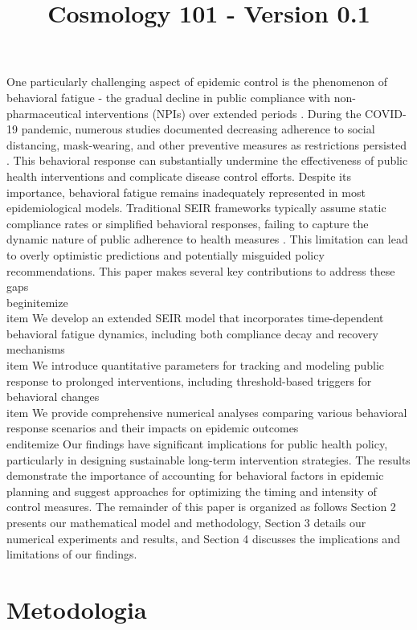 \documentclass{article}\usepackage{graphicx} \usepackage{amsmath} \usepackage{colortbl}\title{Cosmology 101 - Version 0.1}
\begin{document}
One particularly challenging aspect of epidemic control is the phenomenon of behavioral fatigue - the gradual decline in public compliance with non-pharmaceutical interventions (NPIs) over extended periods \cite{harvey2020covid}. During the COVID-19 pandemic, numerous studies documented decreasing adherence to social distancing, mask-wearing, and other preventive measures as restrictions persisted \cite{petherick2021worldwide}. This behavioral response can substantially undermine the effectiveness of public health interventions and complicate disease control efforts.
Despite its importance, behavioral fatigue remains inadequately represented in most epidemiological models. Traditional SEIR frameworks typically assume static compliance rates or simplified behavioral responses, failing to capture the dynamic nature of public adherence to health measures \cite{verelst2016behavioural}. This limitation can lead to overly optimistic predictions and potentially misguided policy recommendations.
This paper makes several key contributions to address these gaps\n\\begin{itemize}\n    \\item We develop an extended SEIR model that incorporates time-dependent behavioral fatigue dynamics, including both compliance decay and recovery mechanisms\n    \\item We introduce quantitative parameters for tracking and modeling public response to prolonged interventions, including threshold-based triggers for behavioral changes\n    \\item We provide comprehensive numerical analyses comparing various behavioral response scenarios and their impacts on epidemic outcomes\n\\end{itemize}
Our findings have significant implications for public health policy, particularly in designing sustainable long-term intervention strategies. The results demonstrate the importance of accounting for behavioral factors in epidemic planning and suggest approaches for optimizing the timing and intensity of control measures. The remainder of this paper is organized as follows Section 2 presents our mathematical model and methodology, Section 3 details our numerical experiments and results, and Section 4 discusses the implications and limitations of our findings.\section{Metodologia}
\end{document}
